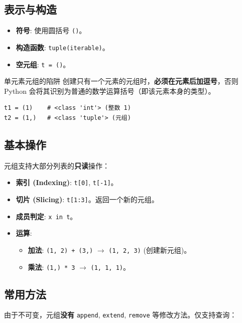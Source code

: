 \documentclass[12pt, a4paper]{article}
\begin{document}
\subsection{表示与构造}

\begin{itemize}
    \item \textbf{符号}: 使用圆括号 \texttt{()}。
    \item \textbf{构造函数}: \texttt{tuple(iterable)}。
    \item \textbf{空元组}: \texttt{t = ()}。
\end{itemize}

\begin{trapbox}{单元素元组的陷阱}
创建只有一个元素的元组时，\textbf{必须在元素后加逗号}，否则 Python 会将其识别为普通的数学运算括号（即该元素本身的类型）。
\begin{lstlisting}
t1 = (1)    # <class 'int'> (整数 1)
t2 = (1,)   # <class 'tuple'> (元组)
\end{lstlisting}
\end{trapbox}

\subsection{基本操作}

元组支持大部分列表的\textbf{只读}操作：

\begin{itemize}
    \item \textbf{索引 (Indexing)}: \texttt{t[0]}, \texttt{t[-1]}。
    \item \textbf{切片 (Slicing)}: \texttt{t[1:3]}。返回一个新的元组。
    \item \textbf{成员判定}: \texttt{x in t}。
    \item \textbf{运算}:
    \begin{itemize}
        \item \textbf{加法}: \texttt{(1, 2) + (3,)} $\to$ \texttt{(1, 2, 3)} (创建新元组)。
        \item \textbf{乘法}: \texttt{(1,) * 3} $\to$ \texttt{(1, 1, 1)}。
    \end{itemize}
\end{itemize}

\subsection{常用方法}

由于不可变，元组\textbf{没有} \texttt{append}, \texttt{extend}, \texttt{remove} 等修改方法。仅支持查询：
\end{document}
